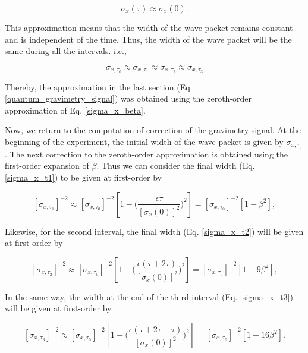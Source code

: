 \documentclass{article}
\begin{document}
\begin{equation}
\sigma_{x}(\tau) \approx \sigma_{x}(0).
\end{equation}

This approximation means that the width of the wave packet remains constant and is independent of the time. Thus, the width of the wave packet will be the same during all the intervals. i.e., 

\begin{equation}
\sigma_{x, \tau_{0}} \approx \sigma_{x, \tau_{1}} \approx \sigma_{x, \tau_{2}} \approx \sigma_{x, \tau_{3}} 
\end{equation}

Thereby, the approximation in the last section (Eq. \ref{quantum_gravimetry_signal}) was obtained using the zeroth-order approximation of Eq. \ref{sigma_x_beta}.
\vfill

Now, we return to the computation of correction of the gravimetry signal. At the beginning of the experiment, the initial width of the wave packet is given by $\sigma_{x, \tau_{0}}$. The next correction to the zeroth-order approximation is obtained using the first-order expansion of $\beta$. Thus we can consider the final width (Eq. \ref{sigma_x_t1}) to be given at first-order by

\begin{equation}\label{sigma_x_t1_first_order}
[\sigma_{x, \tau_{1}}]^{-2} \approx [\sigma_{x, \tau_{0}}]^{-2}\left[1 - \bigg(\frac{\epsilon \tau}{[\sigma_{x}(0)]^{2}}\bigg)^{2}\right] = [\sigma_{x, \tau_{0}}]^{-2}\left[1 - \beta^{2}\right],
\end{equation}

Likewise, for the second interval, the final width (Eq.  \ref{sigma_x_t2}) will be given at first-order by

\begin{equation}\label{sigma_x_t2_first_order}
[\sigma_{x, \tau_{2}}]^{-2} \approx [\sigma_{x, \tau_{0}}]^{-2}\left[1 - \bigg(\frac{\epsilon (\tau+2\tau)}{[\sigma_{x}(0)]^{2}}\bigg)^{2}\right] = [\sigma_{x, \tau_{0}}]^{-2}\left[1 - 9\beta^{2}\right],
\end{equation}

In the same way, the width at the end of the third interval (Eq. \ref{sigma_x_t3}) will be given at first-order by 

\begin{equation}\label{sigma_x_t3_first_order}
[\sigma_{x, \tau_{3}}]^{-2} \approx [\sigma_{x, \tau_{0}}]^{-2}\left[1 - \bigg(\frac{\epsilon (\tau+2\tau+\tau)}{[\sigma_{x}(0)]^{2}}\bigg)^{2}\right] = [\sigma_{x, \tau_{0}}]^{-2}\left[1 - 16\beta^{2}\right].
\end{equation}
\end{document}

